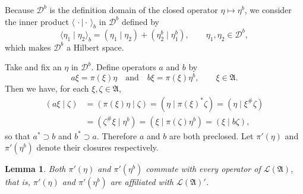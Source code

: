 \documentclass[12pt,b5paper,twoside]{article}
\theoremstyle{takesaki}
\newtheorem{lemma}{Lemma}[section]
\numberwithin{equation}{section}
\begin{document}
Because $\mathcal D^b$ is the definition domain of the closed operator
$\eta\mapsto\eta^b$, we consider the inner product
$\langle\,\cdot\mid\cdot\,\rangle_b$ in $\mathcal D^b$ defined by
\begin{equation}
  \langle\eta_1\mid\eta_2\rangle_b
    =(\eta_1\mid\eta_2)+(\eta_2^b\mid\eta_1^b),
  \qquad \eta_1,\eta_2\in\mathcal D^b,
  \tag{3.2}\label{eq:3.2}
\end{equation}
which makes $\mathcal D^b$ a Hilbert space.

Take and fix an $\eta$ in $\mathcal D^b$.  Define operators $a$ and
$b$ by
\[
  a\xi=\pi(\xi)\eta
  \quad\text{and}\quad
  b\xi=\pi(\xi)\eta^b,\qquad \xi\in\mathfrak A.
\]
Then we have, for each $\xi,\zeta\in\mathfrak A$,
\begin{align*}
  (a\xi\mid\zeta)
    &=(\pi(\xi)\eta\mid\zeta)
      =(\eta\mid\pi(\xi)^*\zeta)
      =(\eta\mid\xi^\#\zeta)\\
    &=(\zeta^\#\xi\mid\eta^b)
      =(\xi\mid\pi(\zeta)\eta^b)
      =(\xi\mid b\zeta),
\end{align*}
so that $a^*\supset b$ and $b^*\supset a$.  Therefore $a$ and $b$ are
both preclosed.  Let $\pi'(\eta)$ and $\pi'(\eta^b)$ denote their
closures respectively.

\begin{lemma}\label{lem:3.1}
Both $\pi'(\eta)$ and $\pi'(\eta^b)$ commute with every operator of
$\mathcal L(\mathfrak A)$, that is, $\pi'(\eta)$ and
$\pi'(\eta^b)$ are affiliated with $\mathcal L(\mathfrak A)'$.
\end{lemma}
\end{document}
